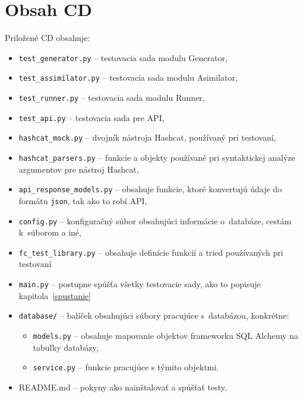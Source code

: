 \chapter{Obsah CD}
\label{cd}
Priložené CD obsahuje:
\begin{itemize}
	\item \texttt{test\_generator.py} -- testovacia sada modulu Generator,
	\item \texttt{test\_assimilator.py} -- testovacia sada modulu Asimilator,
	\item \texttt{test\_runner.py} -- testovacia sada modulu Runner,
	\item \texttt{test\_api.py} -- testovacia sada pre API,
	\item \texttt{hashcat\_mock.py} -- dvojník nástroja Hashcat, používaný pri testovaní,
	\item \texttt{hashcat\_parsers.py} -- funkcie a objekty používané pri syntaktickej analýze argumentov pre nástroj Hashcat,
	\item \texttt{api\_response\_models.py} -- obsahuje funkcie, ktoré konvertujú údaje do formátu \texttt{json}, tak ako to robí API,
	\item \texttt{config.py} -- konfiguračný súbor obsahujúci informácie o~databáze, cestám k~súborom a iné,
	\item \texttt{fc\_test\_library.py} -- obsahuje definície funkcií a tried používaných pri testovaní
	\item \texttt{main.py} -- postupne spúšťa všetky testovacie sady, ako to popisuje kapitola~\ref{spustanie}
	\item \texttt{database/} -- balíček obsahujúci súbory pracujúce s~databázou, konkrétne:
		\begin{itemize}
			\item \texttt{models.py} -- obsahuje mapovanie objektov frameworku SQL Alchemy na tabuľky databázy,
			\item \texttt{service.py} -- funkcie pracujúce s týmito objektmi.
		\end{itemize}
	\item README.md -- pokyny ako nainštalovať a spúšťať testy.
\end{itemize}

